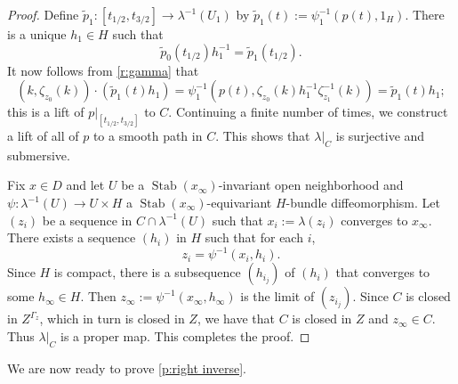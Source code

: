 \documentclass[12pt,reqno]{amsart}
\newcommand{\Stab}{{\operatorname{Stab}}} %
\theoremstyle{plain}
\theoremstyle{definition}
\begin{document}
\begin{proof}
        Define $\widetilde{p}_1\colon[t_{1/2},t_{3/2}]\to \lambda^{-1}(U_1)$ by $\widetilde{p}_1(t):=\psi_1^{-1}(p(t),1_H)$.  There is a unique $h_1\in H$ such that $$\widetilde{p}_0(t_{1/2})h_1^{-1}=\widetilde{p}_1(t_{1/2}).$$  It now follows from \cref{r:gamma} that $$(k,\zeta_{z_0}(k))\cdot\left(\widetilde{p}_1(t)h_1\right)=\psi_1^{-1}(p(t),\zeta_{z_0}(k)h_1^{-1}\zeta_{z_1}^{-1}(k))=\widetilde{p}_1(t)h_1;$$ this is a lift of $p|_{[t_{1/2},t_{3/2}]}$ to $C$.  Continuing a finite number of times, we construct a lift of all of $p$ to a smooth path in $C$.  This shows that $\lambda|_C$ is surjective and submersive.

        Fix $x\in D$ and let $U$ be a $\Stab(x_\infty)$-invariant open neighborhood and $\psi\colon \lambda^{-1}(U)\to U\times H$ a $\Stab(x_\infty)$-equivariant $H$-bundle diffeomorphism. Let $(z_i)$ be a sequence in $C\cap\lambda^{-1}(U)$ such that $x_i:=\lambda(z_i)$ converges to $x_\infty$.   There exists a sequence $(h_i)$ in $H$ such that for each $i$, $$z_i=\psi^{-1}(x_i,h_i).$$  Since $H$ is compact, there is a subsequence $\left(h_{i_j}\right)$ of $(h_i)$ that converges to some $h_\infty\in H$.  Then $z_\infty:=\psi^{-1}(x_\infty,h_\infty)$ is the limit of $\left(z_{i_j}\right)$.  Since $C$ is closed in $Z^{\Gamma_z}$, which in turn is closed in $Z$, we have that $C$ is closed in $Z$ and $z_\infty\in C$.  Thus $\lambda|_C$ is a proper map.  This completes the proof.
    \end{proof}    

    We are now ready to prove \cref{p:right inverse}.
\end{document}
